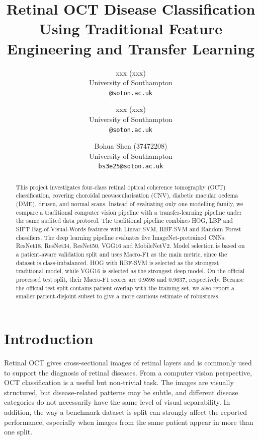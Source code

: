 \documentclass[10pt,twocolumn,letterpaper]{article}
\begin{document}
\title{Retinal OCT Disease Classification Using Traditional Feature Engineering and Transfer Learning}

\author{
xxx (xxx)\\
University of Southampton\\
{\tt\small @soton.ac.uk}
\and
xxx (xxx)\\
University of Southampton\\
{\tt\small @soton.ac.uk}
\and
Bohua Shen (37472208)\\
University of Southampton\\
{\tt\small bs3e25@soton.ac.uk}
}

\maketitle

\begin{abstract}
This project investigates four-class retinal optical coherence tomography (OCT) classification, covering choroidal neovascularisation (CNV), diabetic macular oedema (DME), drusen, and normal scans. Instead of evaluating only one modelling family, we compare a traditional computer vision pipeline with a transfer-learning pipeline under the same audited data protocol. The traditional pipeline combines HOG, LBP and SIFT Bag-of-Visual-Words features with Linear SVM, RBF-SVM and Random Forest classifiers. The deep learning pipeline evaluates five ImageNet-pretrained CNNs: ResNet18, ResNet34, ResNet50, VGG16 and MobileNetV2. Model selection is based on a patient-aware validation split and uses Macro-F1 as the main metric, since the dataset is class-imbalanced. HOG with RBF-SVM is selected as the strongest traditional model, while VGG16 is selected as the strongest deep model. On the official processed test split, their Macro-F1 scores are 0.9598 and 0.9637, respectively. Because the official test split contains patient overlap with the training set, we also report a smaller patient-disjoint subset to give a more cautious estimate of robustness.
\end{abstract}

\section{Introduction}
Retinal OCT gives cross-sectional images of retinal layers and is commonly used to support the diagnosis of retinal diseases. From a computer vision perspective, OCT classification is a useful but non-trivial task. The images are visually structured, but disease-related patterns may be subtle, and different disease categories do not necessarily have the same level of visual separability. In addition, the way a benchmark dataset is split can strongly affect the reported performance, especially when images from the same patient appear in more than one split.
\end{document}
